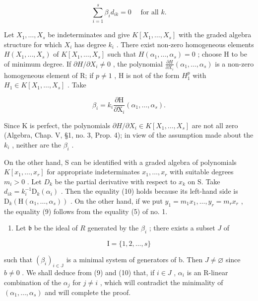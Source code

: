 \[
\sum_ {i = 1} ^ {s} \beta_ {i} d _ {i k} = 0 \quad \text { for   all } k.\tag{10}
\]

Let \(X_{1},\ldots,X_{s}\) be indeterminates and give \(K[X_{1},\ldots,X_{s}]\) with the graded algebra structure for which \(X_{i}\) has degree \(k_{i}\) . There exist non-zero homogeneous elements \(H(X_{1},\ldots,X_{s})\) of \(K[X_{1},\ldots,X_{s}]\) such that \(H(\alpha_{1},\ldots,\alpha_{s})=0\) ; choose H to be of minimum degree. If \(\partial H/\partial X_{i}\neq0\) , the polynomial \(\frac{\partial H}{\partial X_{i}}(\alpha_{1},\ldots,\alpha_{s})\) is a non-zero homogeneous element of R; if \(p\neq1\) , H is not of the form \(H_{1}^{p}\) with \(H_{1}\in K[X_{1},\ldots,X_{s}]\) . Take

\[
\beta_ {i} = k _ {i} \frac {\partial \mathrm{H}}{\partial \mathrm{X} _ {i}} (\alpha_ {1}, \dots , \alpha_ {s}).
\]

Since K is perfect, the polynomials \(\partial H/\partial X_{i} \in K[X_{1},\ldots,X_{s}]\) are not all zero (Algebra, Chap. V, §1, no. 3, Prop. 4); in view of the assumption made about the \(k_{i}\) , neither are the \(\beta_{i}\) .

On the other hand, S can be identified with a graded algebra of polynomials \(K[x_{1},\ldots,x_{r}]\) for appropriate indeterminates \(x_{1},\ldots,x_{r}\) with suitable degrees \(m_{i}>0\) . Let \(D_{k}\) be the partial derivative with respect to \(x_{k}\) on S. Take \(d_{ik} = k_i^{-1}\mathrm{D}_k(\alpha_i)\) . Then the equality (10) holds because its left-hand side is \(\mathrm{D}_k(\mathrm{H}(\alpha_1,\dots ,\alpha_s))\) . On the other hand, if we put \(y_{1} = m_{1}x_{1},\ldots ,y_{r} = m_{r}x_{r}\) , the equality (9) follows from the equality (5) of no. 1.

\begin{enumerate}
\def\labelenumi{\arabic{enumi})}
\setcounter{enumi}{1}
\tightlist
\item
  Let \(\mathfrak{b}\) be the ideal of \(R\) generated by the \(\beta_{i}\) ; there exists a subset \(J\) of
\end{enumerate}

\[
\mathrm{I} = \{1, 2, \dots , s \}
\]

such that \((\beta_{i})_{i\in\mathbb{J}}\) is a minimal system of generators of b. Then \(J\neq\varnothing\) since \(b\neq0\) . We shall deduce from (9) and (10) that, if \(i\in J\) , \(\alpha_{i}\) is an R-linear combination of the \(\alpha_{j}\) for \(j\neq i\) , which will contradict the minimality of \((\alpha_{1},\ldots,\alpha_{s})\) and will complete the proof.

